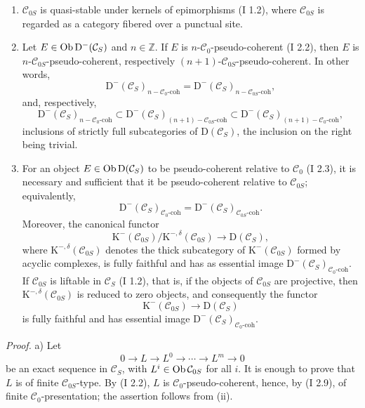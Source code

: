 \documentclass[11pt]{article}
\begin{document}
\begin{enumerate}[label=\alph*)]
\item $\mathcal C_{0S}$ is quasi-stable under kernels of epimorphisms (I 1.2), where $\mathcal C_{0S}$ is regarded as a category fibered over a punctual site.
\item Let $E\in\operatorname{Ob} \mathrm D^{-}(\mathcal C_S)$ and $n\in\mathbb Z$. If $E$ is $n$-$\mathcal C_0$-pseudo-coherent (I 2.2), then $E$ is $n$-$\mathcal C_{0S}$-pseudo-coherent, respectively $(n+1)$-$\mathcal C_{0S}$-pseudo-coherent. In other words,
\[
\mathrm D^{-}(\mathcal C_S)_{n-\mathcal C_0\text{-coh}}
=
\mathrm D^{-}(\mathcal C_S)_{n-\mathcal C_{0S}\text{-coh}},
\]
and, respectively,
\[
\mathrm D^{-}(\mathcal C_S)_{n-\mathcal C_0\text{-coh}}
\subset
\mathrm D^{-}(\mathcal C_S)_{(n+1)-\mathcal C_{0S}\text{-coh}}
\subset
\mathrm D^{-}(\mathcal C_S)_{(n+1)-\mathcal C_0\text{-coh}},
\]
inclusions of strictly full subcategories of $\mathrm D(\mathcal C_S)$, the inclusion on the right being trivial.
\item For an object $E\in\operatorname{Ob}\mathrm D(\mathcal C_S)$ to be pseudo-coherent relative to $\mathcal C_0$ (I 2.3), it is necessary and sufficient that it be pseudo-coherent relative to $\mathcal C_{0S}$; equivalently,
\[
\mathrm D^{-}(\mathcal C_S)_{\mathcal C_0\text{-coh}}
=
\mathrm D^{-}(\mathcal C_S)_{\mathcal C_{0S}\text{-coh}}.
\]
Moreover, the canonical functor
\[
\mathrm K^{-}(\mathcal C_{0S})/\mathrm K^{-,\delta}(\mathcal C_{0S})
\longrightarrow \mathrm D(\mathcal C_S),
\]
where $\mathrm K^{-,\delta}(\mathcal C_{0S})$ denotes the thick subcategory of $\mathrm K^{-}(\mathcal C_{0S})$ formed by acyclic complexes, is fully faithful and has as essential image $\mathrm D^{-}(\mathcal C_S)_{\mathcal C_0\text{-coh}}$. If $\mathcal C_{0S}$ is liftable in $\mathcal C_S$ (I 1.2), that is, if the objects of $\mathcal C_{0S}$ are projective, then $\mathrm K^{-,\delta}(\mathcal C_{0S})$ is reduced to zero objects, and consequently the functor
\[
\mathrm K^{-}(\mathcal C_{0S})\longrightarrow \mathrm D(\mathcal C_S)
\]
is fully faithful and has essential image $\mathrm D^{-}(\mathcal C_S)_{\mathcal C_0\text{-coh}}$.
\end{enumerate}

\emph{Proof.} a) Let
\[
0\longrightarrow L\longrightarrow L^0\longrightarrow\cdots\longrightarrow L^m\longrightarrow0
\]
be an exact sequence in $\mathcal C_S$, with $L^i\in\operatorname{Ob}\mathcal C_{0S}$ for all $i$. It is enough to prove that $L$ is of finite $\mathcal C_{0S}$-type. By (I 2.2), $L$ is $\mathcal C_0$-pseudo-coherent, hence, by (I 2.9), of finite $\mathcal C_0$-presentation; the assertion follows from (ii).
\end{document}
